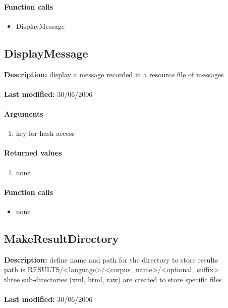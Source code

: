 \paragraph{Function calls}
\begin{itemize}
\item DisplayMessage
\end{itemize}

\subsection{DisplayMessage}
\textbf{Description:} display a message recorded in a resource file of messages\\
\\\textbf{Last modified:} 30/06/2006

\paragraph{Arguments}
\begin{enumerate}
\item key for hash access
\end{enumerate}

\paragraph{Returned values}
\begin{enumerate}
\item none
\end{enumerate}

\paragraph{Function calls}
\begin{itemize}
\item none
\end{itemize}

\subsection{MakeResultDirectory}
\textbf{Description:} define name and path for the directory to store results\\
path is RESULTS/<language>/<corpus\_name>/<optional\_suffix>\\
three sub-directories (xml, html, raw) are created to store specific files\\
\\\textbf{Last modified:} 30/06/2006

